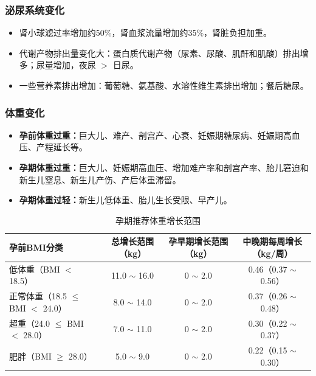 \subsubsection{泌尿系统变化}

\begin{keybox}
\begin{itemize}[leftmargin=*]
    \item 肾小球滤过率增加约50\%，肾血浆流量增加约35\%，肾脏负担加重。
    \item 代谢产物排出量变化大：蛋白质代谢产物（尿素、尿酸、肌酐和肌酸）排出增多；尿量增加，夜尿 $>$ 日尿。
    \item 一些营养素排出增加：葡萄糖、氨基酸、水溶性维生素排出增加；餐后糖尿。
\end{itemize}
\end{keybox}

\subsubsection{体重变化}

\begin{keybox}
\begin{itemize}[leftmargin=*]
    \item \textbf{孕前体重过重：}巨大儿、难产、剖宫产、心衰、妊娠期糖尿病、妊娠期高血压、产程延长等。
    \item \textbf{孕期体重过重：}巨大儿、妊娠期高血压、增加难产率和剖宫产率、胎儿窘迫和新生儿窒息、新生儿产伤、产后体重滞留。
    \item \textbf{孕期体重过轻：}新生儿低体重、胎儿生长受限、早产儿。
\end{itemize}
\end{keybox}

\begin{table}[h!]
\centering
\caption{孕期推荐体重增长范围}
\begin{tabular}{lccc}
\hline
\textbf{孕前BMI分类} & \textbf{总增长范围（kg）} & \textbf{孕早期增长范围（kg）} & \textbf{中晚期每周增长（kg/周）} \\
\hline
低体重（BMI $<$ 18.5） & 11.0 $\sim$ 16.0 & 0 $\sim$ 2.0 & 0.46（0.37 $\sim$ 0.56） \\
正常体重（18.5 $\leq$ BMI $<$ 24.0） & 8.0 $\sim$ 14.0 & 0 $\sim$ 2.0 & 0.37（0.26 $\sim$ 0.48） \\
超重（24.0 $\leq$ BMI $<$ 28.0） & 7.0 $\sim$ 11.0 & 0 $\sim$ 2.0 & 0.30（0.22 $\sim$ 0.37） \\
肥胖（BMI $\geq$ 28.0） & 5.0 $\sim$ 9.0 & 0 $\sim$ 2.0 & 0.22（0.15 $\sim$ 0.30） \\
\hline
\end{tabular}
\end{table}

